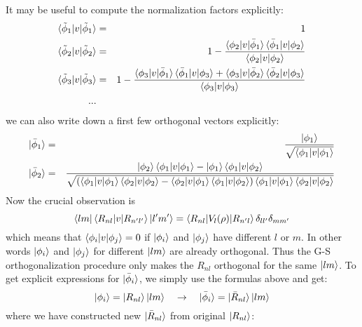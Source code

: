 It may be useful to compute the normalization factors explicitly: 
\begin{eqnarray*}
\mathinner{\langle{\tilde\phi_1|v|\tilde\phi_1}\rangle}&=&1 \\
\mathinner{\langle{\tilde\phi_2|v|\tilde\phi_2}\rangle}&=&1 -{\mathinner{\langle{\phi_2|v|\bar\phi_1}\rangle}\mathinner{\langle{\bar\phi_1|v|\phi_2}\rangle} \over\mathinner{\langle{\phi_2|v|\phi_2}\rangle}} \\
\mathinner{\langle{\tilde\phi_3|v|\tilde\phi_3}\rangle}&=&1 -{\mathinner{\langle{\phi_3|v|\bar\phi_1}\rangle}\mathinner{\langle{\bar\phi_1|v|\phi_3}\rangle}+ \mathinner{\langle{\phi_3|v|\bar\phi_2}\rangle}\mathinner{\langle{\bar\phi_2|v|\phi_3}\rangle} \over\mathinner{\langle{\phi_3|v|\phi_3}\rangle}} \\
...& \\
\end{eqnarray*}
 we can also write down a first few orthogonal vectors explicitly: 
\begin{eqnarray*}
\mathinner{|{\bar\phi_1}\rangle}&=&{\mathinner{|{\phi_1}\rangle}\over\sqrt{\mathinner{\langle{\phi_1|v|\phi_1}\rangle}}} \\
\mathinner{|{\bar\phi_2}\rangle}&=&{\mathinner{|{\phi_2}\rangle}\mathinner{\langle{\phi_1|v|\phi_1}\rangle}-\mathinner{|{\phi_1}\rangle}\mathinner{\langle{\phi_1|v|\phi_2}\rangle} \over\sqrt{(\mathinner{\langle{\phi_1|v|\phi_1}\rangle}\mathinner{\langle{\phi_2|v|\phi_2}\rangle}-\mathinner{\langle{\phi_2|v|\phi_1}\rangle}\mathinner{\langle{\phi_1|v|\phi_2}\rangle})\mathinner{\langle{\phi_1|v|\phi_1}\rangle}\mathinner{\langle{\phi_2|v|\phi_2}\rangle}}} \\
\end{eqnarray*}
 Now the crucial observation is 
\begin{equation*}
  \mathinner{\langle{lm}|}\mathinner{\langle{R_{nl}|v|R_{n'l'}}\rangle}\mathinner{|{l'm'}\rangle}= \mathinner{\langle{R_{nl}|V_l(\rho)|R_{n'l}}\rangle}\delta_{ll'}\delta_{mm'}
\end{equation*}
which means that $\mathinner{\langle{\phi_i|v|\phi_j}\rangle}=0$ if $\mathinner{|{\phi_i}\rangle}$ and $\mathinner{|{\phi_j}\rangle}$ have different $l$ or $m$. In other words $\mathinner{|{\phi_i}\rangle}$ and $\mathinner{|{\phi_j}\rangle}$ for different $\mathinner{|{lm}\rangle}$ are already orthogonal. Thus the G-S orthogonalization procedure only makes the $R_{nl}$ orthogonal for the same $\mathinner{|{lm}\rangle}$. To get explicit expressions for $\mathinner{|{\bar\phi_i}\rangle}$, we simply use the formulas above and get: 
\begin{equation*}
  \mathinner{|{\phi_i}\rangle}=\mathinner{|{R_{nl}}\rangle}\mathinner{|{lm}\rangle}\quad\to\quad \mathinner{|{\bar\phi_i}\rangle}=\mathinner{|{\bar R_{nl}}\rangle}\mathinner{|{lm}\rangle}
\end{equation*}
where we have constructed new $\mathinner{|{\bar R_{nl}}\rangle}$ from original $\mathinner{|{R_{nl}}\rangle}$: 
